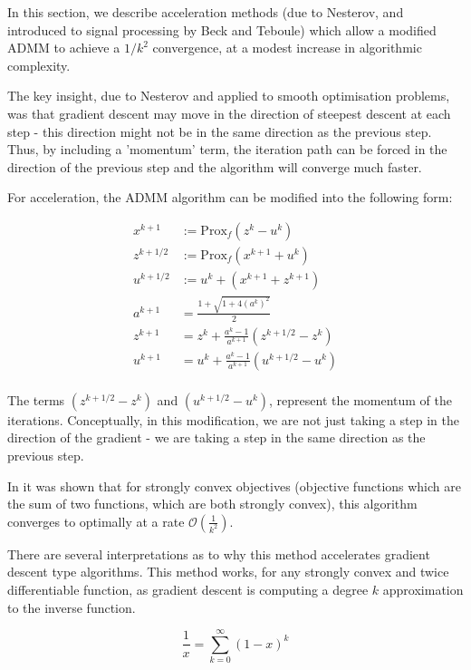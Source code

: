 In this section, we describe acceleration methods (due to Nesterov, and introduced to signal processing by Beck and Teboule) which allow a modified ADMM to achieve a \(1/k^2\) convergence, at a modest increase in algorithmic complexity.

The key insight, due to Nesterov and applied to smooth optimisation problems, was that gradient descent may move in the direction of steepest descent at each step - this direction might not be in the same direction as the previous step. Thus, by including a 'momentum' term, the iteration path can be forced in the direction of the previous step and the algorithm will converge much faster.

For acceleration, the ADMM algorithm can be modified into the following form:

\begin{align}
x^{k+1} &:= \mathrm{Prox}_f \left( z^k - u^k\right)\\
z^{k+1/2} &:= \mathrm{Prox}_f \left(x^{k+1} + u^k\right)  \\
u^{k+1/2} &:= u^{k} + \left(x^{k+1} + z^{k+1}\right) \\
a^{k+1} &= \frac{1+\sqrt{1+4(a^k)^2}}{2} \\
z^{k+1} &= z^k + \frac{a^{k}-1}{a^{k+1}}\left(z^{k+1/2} - z^{k}\right) \\
u^{k+1} &= u^k + \frac{a^{k}-1}{a^{k+1}}\left(u^{k+1/2} - u^{k}\right) \\	
\end{align}

The terms \( \left(z^{k+1/2} - z^{k}\right) \) and \(\left(u^{k+1/2} - u^{k}\right) \), represent the momentum of the iterations. Conceptually, in this modification, we are not just taking a step in the direction of the gradient - we are taking a step in the same direction as the previous step.

In \cite{goldstein2014fast} it was shown that for strongly convex objectives (objective functions which are the sum of two functions, which are both strongly convex), this algorithm converges to optimally at a rate \( \mathcal{O}\left( \frac{1}{k^2} \right) \).

There are several interpretations as to why this method accelerates gradient descent type algorithms. This method works, for any strongly convex and twice differentiable function, as gradient descent is computing a degree \(k\) approximation to the inverse function.  

\begin{equation}
\frac{1}{x} = \sum_{k=0}^{\infty} \left(1-x\right)^k
\end{equation}

